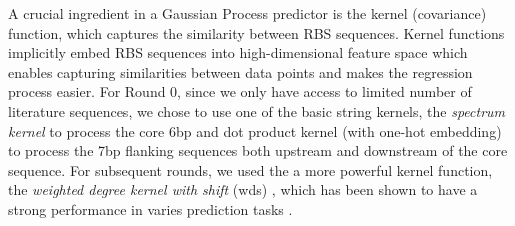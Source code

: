 \documentclass{article}
\begin{document}
A crucial ingredient in a Gaussian Process predictor \cite{Rasmussen2004} is the kernel (covariance) function, which captures the similarity between RBS sequences.
Kernel functions implicitly embed RBS sequences into high-dimensional feature space which enables capturing similarities between data points and makes the regression process easier.
For Round 0, since we only have access to limited number of literature sequences, we chose to use one of the basic string kernels, the \textit{spectrum kernel} \cite{leslie2001spectrum} to process the core 6bp and dot product kernel \cite{Rasmussen2004} (with one-hot embedding) to process the 7bp flanking sequences both upstream and downstream of the core sequence.
For subsequent rounds, we used the a more powerful kernel function, the \textit{weighted degree kernel with shift} (wds) \cite{ratsch_rase_2005_wds}, which has been shown to have a strong performance in varies prediction tasks \cite{Ben-Hur2008}.

  
\end{document}
